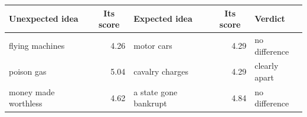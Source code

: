 \begin{tabular}{lrlr l}
\toprule
Unexpected idea & \multicolumn{1}{c}{Its score} & Expected idea & \multicolumn{1}{c}{Its score} & Verdict \\
\midrule
flying machines & 4.26 & motor cars & 4.29 & no difference \\
poison gas & 5.04 & cavalry charges & 4.29 & clearly apart \\
money made worthless & 4.62 & a state gone bankrupt & 4.84 & no difference \\
\bottomrule
\end{tabular}